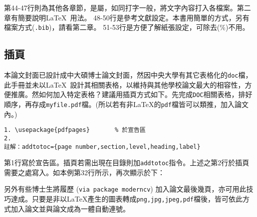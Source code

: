 第44-47行則為其他各章節，是屬，如同打字一般，將文字內容打入各檔案。第二章有簡要說明\LaTeX\ 用法。
48-50行是參考文獻設定。本書用簡單的方式，另有檔案方式({\tt.bib})，請看第二章。
51-53行是方便了解紙張設定，可除去(\%)不用。
\subsection{插頁}
本論文封面已設計成中大碩博士論文封面，然因中央大學有其它表格化的{\tt doc}檔，此手冊並未以\LaTeX\ 設計其相關表格，以維持與其他學校論文最大的相容性，方便推廣。然如何加入特定表格？建議用插頁方式如下。先完成{\tt DOC}相關表格，排好順序，再存成{\tt myfile.pdf}檔。(所以若有非\LaTeX{}的{\tt pdf}檔皆可以類推，加入論文內。)
\begin{verbatim}
1. \usepackage{pdfpages}       % 於宣告區
2. 
註解：addtotoc={page number,section,level,heading,label}
\end{verbatim}
第1行寫於宣告區。插頁若需出現在目錄則加{\tt addtotoc}指令。上述之第2行於插頁需要之處寫入。如本例第32行所示，再次顯示於下：

另外有些博士生將履歷 ({\tt via package moderncv}) 加入論文最後幾頁，亦可用此技巧達成。只要是非以\LaTeX{}產生的圖表轉成{\tt png,jpg,jpeg,pdf}檔後，皆可依此方式加入論文並與論文成為一體自動連號。


